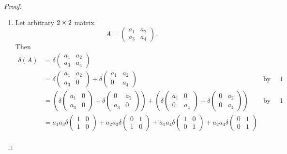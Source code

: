 \begin{proof}
\begin{enumerate}
\item
Let arbitrary \(2 \times 2\) matrix
\[
    A = \begin{pmatrix}
        a_1 & a_2 \\ a_3 & a_4
    \end{pmatrix}.
\]
Then
\begin{align*}
    \delta(A) & = \delta \begin{pmatrix} a_1 & a_2 \\ a_3 & a_4 \end{pmatrix} \\
              & = \delta \begin{pmatrix} a_1 & a_2 \\ a_3 & 0 \end{pmatrix}
                + \delta \begin{pmatrix} a_1 & a_2 \\ 0 & a_4 \end{pmatrix} & \text{by (i), fix row \(1\)} \\
              & = \left(
                    \delta \begin{pmatrix} a_1 & 0 \\ a_3 & 0 \end{pmatrix}
                    + \delta \begin{pmatrix} 0 & a_2 \\ a_3 & 0 \end{pmatrix}
                \right)
                + \left(
                    \delta \begin{pmatrix} a_1 & 0 \\ 0 & a_4 \end{pmatrix}
                    + \delta \begin{pmatrix} 0 & a_2 \\ 0 & a_4 \end{pmatrix}
                \right) & \text{by (i), fix row \(1\)} \\
              & = a_1 a_3 \delta \begin{pmatrix} 1 & 0 \\ 1 & 0 \end{pmatrix}
                + a_2 a_3 \delta \begin{pmatrix} 0 & 1 \\ 1 & 0 \end{pmatrix}
                + a_1 a_4 \delta \begin{pmatrix} 1 & 0 \\ 0 & 1 \end{pmatrix}
                + a_2 a_4 \delta \begin{pmatrix} 0 & 1 \\ 0 & 1 \end{pmatrix} \\

\end{align*}
\end{enumerate}
\end{proof}
